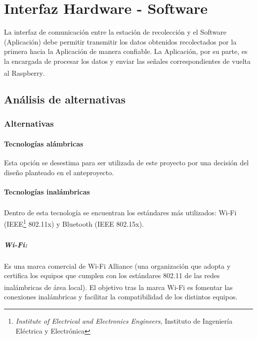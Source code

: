 \chapter{Interfaz Hardware - Software}
\par La interfaz de comunicación entre la estación de recolección y el Software (Aplicación) debe permitir transmitir los datos obtenidos recolectados por la primera hacia la Aplicación de manera confiable. La Aplicación, por su parte, es la encargada de procesar los datos y enviar las señales correspondientes de vuelta al Raspberry\textsuperscript{\textregistered}.

    \section{Análisis de alternativas}
        \subsection{Alternativas}
            \subsubsection{Tecnologías alámbricas}
                \par Esta opción se desestima para ser utilizada de este proyecto por una decisión del diseño planteado en el anteproyecto.
            \subsubsection{Tecnologías inalámbricas}
                \par Dentro de esta tecnología se encuentran los estándares más utilizados: Wi-Fi\textsuperscript{\textregistered} (IEEE\footnote{ \textit{Institute of Electrical and Electronics Engineers}, Instituto de Ingeniería Eléctrica y Electrónica} 802.11x) y Bluetooth\textsuperscript{\textregistered} (IEEE 802.15x).
                
                \paragraph{Wi-Fi\textsuperscript{\textregistered}:} Es una marca comercial de Wi-Fi Alliance (una organización que adopta y certifica los equipos que cumplen con los estándares 802.11 de las redes inalámbricas de área local). El objetivo tras la marca Wi-Fi\textsuperscript{\textregistered} es fomentar las conexiones inalámbricas y facilitar la compatibilidad de los distintos equipos.
                
